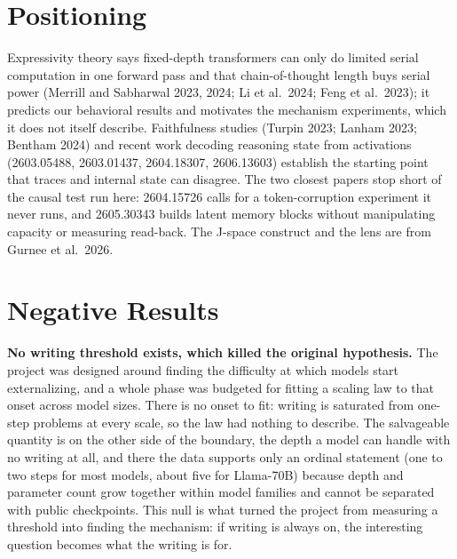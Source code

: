 \section{Positioning}\label{positioning}

Expressivity theory says fixed-depth transformers can only do limited
serial computation in one forward pass and that chain-of-thought length
buys serial power (Merrill and Sabharwal 2023, 2024; Li et al.~2024;
Feng et al.~2023); it predicts our behavioral results and motivates the
mechanism experiments, which it does not itself describe. Faithfulness
studies (Turpin 2023; Lanham 2023; Bentham 2024) and recent work
decoding reasoning state from activations (2603.05488, 2603.01437,
2604.18307, 2606.13603) establish the starting point that traces and
internal state can disagree. The two closest papers stop short of the
causal test run here: 2604.15726 calls for a token-corruption experiment
it never runs, and 2605.30343 builds latent memory blocks without
manipulating capacity or measuring read-back. The J-space construct and
the lens are from Gurnee et al.~2026.

\section{Negative Results}\label{negative-results}

\textbf{No writing threshold exists, which killed the original
hypothesis.} The project was designed around finding the difficulty at
which models start externalizing, and a whole phase was budgeted for
fitting a scaling law to that onset across model sizes. There is no
onset to fit: writing is saturated from one-step problems at every
scale, so the law had nothing to describe. The salvageable quantity is
on the other side of the boundary, the depth a model can handle with no
writing at all, and there the data supports only an ordinal statement
(one to two steps for most models, about five for Llama-70B) because
depth and parameter count grow together within model families and cannot
be separated with public checkpoints. This null is what turned the
project from measuring a threshold into finding the mechanism: if
writing is always on, the interesting question becomes what the writing
is for.

